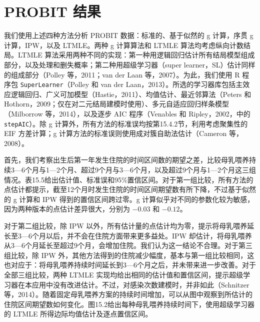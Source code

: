 \section{PROBIT 结果}

我们使用上述四种方法分析 PROBIT 数据：标准的、基于似然的 g 计算，序贯 g 计算，IPW，以及 LTMLE。两种 g 计算算法和 LTMLE 算法均考虑纵向计数结局。LTMLE 算法采用两种不同的实现：第一种用逻辑回归估计所有结局模型组成部分，以及处理和删失概率；第二种用超级学习器（super learner，SL）估计同样的组成部分（Polley 等，2011；van der Laan 等，2007）。为此，我们使用 R 程序包 \texttt{SuperLearner}（Polley 和 van der Laan，2013）。所选的学习器库包括主效应逻辑回归、广义可加模型（Hastie，2011）、均值估计、最近邻算法（Peters 和 Hothorn，2009；仅在对二元结局建模时使用）、多元自适应回归样条模型（Milborrow 等，2014），以及逐步 AIC 程序（Venables 和 Ripley，2002，中的 \texttt{stepAIC}）。除 g 计算外，所有方法的标准误均按第15.4.2节，利用考虑聚集性的 EIF 方差计算；g 计算方法的标准误则使用成对簇自助法估计（Cameron 等，2008）。

首先，我们考察出生后第一年发生住院的时间区间数的期望之差，比较母乳喂养持续3—6个月与1—2个月、超过9个月与3—6个月，以及超过9个月与1—2个月这三组情况。表15.5给出估计值、标准误和95\%置信区间。对于第一组比较，所有方法的点估计都提示，截至12个月时发生住院的时间区间期望数有所下降，不过基于似然的 g 计算和 IPW 得到的置信区间跨过零。g 计算似乎对不同的参数化较为敏感，因为两种版本的点估计差异很大，分别为 $-0.03$ 和 $-0.12$。

对于第二组比较，除 IPW 以外，所有估计量的点估计均为零，提示将母乳喂养延长至3—6个月以后，并不会在住院方面带来更多益处。IPW 却估计，将母乳喂养从3—6个月延长至超过9个月，会增加住院。我们认为这一结论不合理。对于第三组比较，除 IPW 外，其他方法得到的住院减少幅度，基本与第一组比较相同，这也对应于：将母乳喂养持续时间延长到3—6个月之后，并未带来进一步改善。对于全部三组比较，两种 LTMLE 实现均给出相同的估计值和置信区间，提示超级学习器在本应用中没有改进估计。不过，对感染次数建模时，并非如此（Schnitzer 等，2014）。随着固定母乳喂养方案的持续时间增加，可以从图中观察到所估计的住院区间期望数如何变化。图15.2给出每种母乳喂养持续时间下，使用超级学习器的 LTMLE 所得边际均值估计及逐点置信区间。


